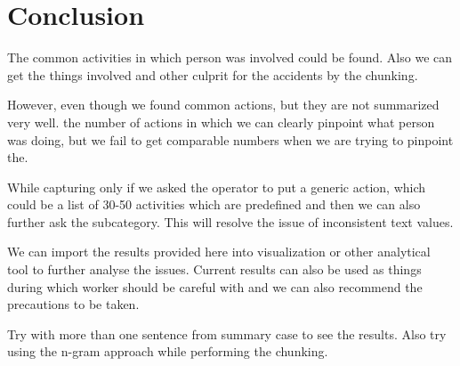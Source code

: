 \documentclass[DIV=calc, paper=a4, fontsize=11pt, twocolumn]{scrartcl}	 %
\begin{document}
\section{Conclusion}

The common activities in which person was involved could be found.
Also we can get the things involved and other culprit for the
accidents by the chunking.

However, even though we found common actions, but they are not summarized very well.
the number of actions in which we can clearly pinpoint what person was
doing, but we fail to get comparable numbers when we are trying to
pinpoint the.

While capturing only if we asked the operator to put a generic action,
which could be a list of 30-50 activities which are predefined and
then we can also further ask the subcategory. This will resolve the
issue of inconsistent text values.

We can import the results provided here into visualization or other analytical tool to further analyse the issues.
Current results can also be used as things during which worker should
be careful with and we can also recommend the precautions to be taken.

Try with more than one sentence from summary case to see the results.
Also try using the n-gram approach while performing the chunking.



{}

\end{document}
